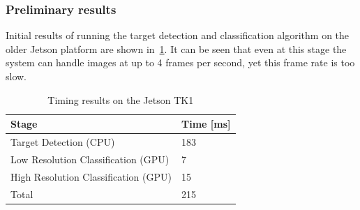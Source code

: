 \documentclass{article} %
\begin{document}
\subsubsection{Preliminary results}
Initial results of running the target detection and classification algorithm on
the older Jetson platform are shown in~\cref{tb:jetson1}. It can be seen that even at this
stage the system can handle images at up to 4 frames per second, yet this frame
rate is too slow.
\begin{table}
	\centering
	\begin{tabular}{ | l | l | }
		\hline
		Stage                                & Time [ms] \\ \hline
		Target Detection (CPU)               & 183       \\ \hline
		Low Resolution Classification (GPU)  & 7         \\ \hline
		High Resolution Classification (GPU) & 15        \\ \hline
		Total                                & 215       \\ \hline
	\end{tabular}
	\caption{Timing results on the Jetson TK1}
	\label{tb:jetson1}
\end{table}
\end{document}
